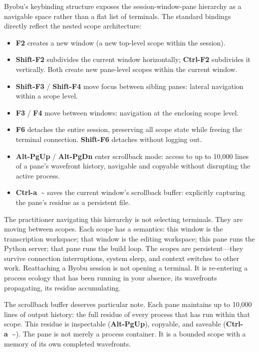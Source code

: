 \documentclass[12pt, a4paper]{article}
\begin{document}
Byobu's keybinding structure exposes the session-window-pane
hierarchy as a navigable space rather than a flat list of
terminals. The standard bindings directly reflect the nested
scope architecture:

\begin{itemize}
\item \textbf{F2} creates a new window (a new top-level scope
  within the session).
\item \textbf{Shift-F2} subdivides the current window
  horizontally; \textbf{Ctrl-F2} subdivides it vertically.
  Both create new pane-level scopes within the current window.
\item \textbf{Shift-F3} / \textbf{Shift-F4} move focus between
  sibling panes: lateral navigation within a scope level.
\item \textbf{F3} / \textbf{F4} move between windows:
  navigation at the enclosing scope level.
\item \textbf{F6} detaches the entire session, preserving all
  scope state while freeing the terminal connection.
  \textbf{Shift-F6} detaches without logging out.
\item \textbf{Alt-PgUp} / \textbf{Alt-PgDn} enter scrollback
  mode: access to up to 10,000 lines of a pane's wavefront
  history, navigable and copyable without disrupting the active
  process.
\item \textbf{Ctrl-a~\textasciitilde} saves the current window's
  scrollback buffer: explicitly capturing the pane's residue
  as a persistent file.
\end{itemize}

The practitioner navigating this hierarchy is not selecting
terminals. They are moving between scopes. Each scope has a
semantics: this window is the transcription workspace; that
window is the editing workspace; this pane runs the Python
server; that pane runs the build loop. The scopes are
persistent---they survive connection interruptions, system
sleep, and context switches to other work. Reattaching a Byobu
session is not opening a terminal. It is re-entering a process
ecology that has been running in your absence, its wavefronts
propagating, its residue accumulating.

The scrollback buffer deserves particular note. Each pane
maintains up to 10,000 lines of output history: the full
residue of every process that has run within that scope.
This residue is inspectable (\textbf{Alt-PgUp}), copyable,
and saveable (\textbf{Ctrl-a~\textasciitilde}). The pane is
not merely a process container. It is a bounded scope with a
memory of its own completed wavefronts.
\end{document}
